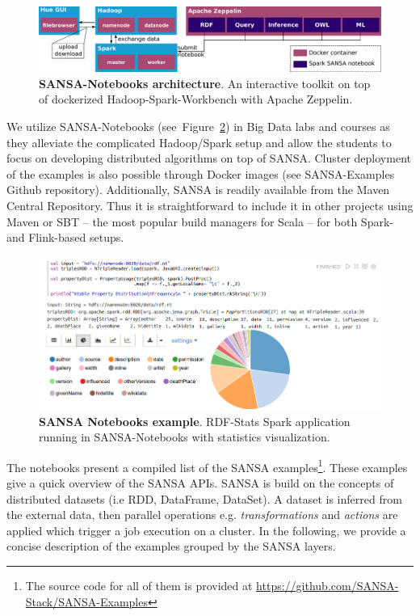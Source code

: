 \begin{figure}
    \centering
    \includegraphics[width=\textwidth]{images/7_implemenation_and_usecases/SANSA-Notebook-architecture.pdf}
    \caption{\textbf{SANSA-Notebooks architecture}.
    An interactive toolkit on top of dockerized Hadoop-Spark-Workbench with Apache Zeppelin.}
    \label{fig:notebooks_arch}
\end{figure}

We utilize SANSA-Notebooks (see~Figure~\ref{fig:notebooks}) in Big Data labs and courses as they alleviate the complicated Hadoop/Spark setup and allow the students to focus on developing distributed algorithms on top of SANSA. 
Cluster deployment of the examples is also possible through Docker images (see SANSA-Examples Github repository). 
Additionally, SANSA is readily available from the Maven Central Repository. 
Thus it is straightforward to include it in other projects using Maven or SBT -- the most popular build managers for Scala -- for both Spark- and Flink-based setups. 

\begin{figure}
    \centering
    \includegraphics[width=.9\textwidth]{images/7_implemenation_and_usecases/RDF-Statistics_withoutlangTAG-cropped.png}
    \caption{\textbf{SANSA Notebooks example}.
    RDF-Stats Spark application running in SANSA-Notebooks with statistics visualization.}
    \label{fig:notebooks}
\end{figure}

The notebooks present a compiled list of the SANSA examples\footnote{\scriptsize{The source code for all of them is provided at \url{https://github.com/SANSA-Stack/SANSA-Examples}}}.
These examples give a quick overview of the SANSA \gls{API}s.
SANSA is build on the concepts of distributed datasets (i.e \gls{RDD}, DataFrame, DataSet). 
A dataset is inferred from the external data, then parallel operations e.g. \textit{transformations} and \textit{actions} are applied which trigger a job execution on a cluster.
In the following, we provide a concise description of the examples grouped by the SANSA layers.

